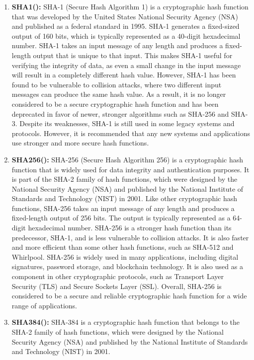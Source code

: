 \documentclass{article}
\begin{document}
\begin{enumerate}
    \item \textbf{SHA1():}
    SHA-1 (Secure Hash Algorithm 1) is a cryptographic hash function that was developed by the United States National Security Agency (NSA) and published as a federal standard in 1995. SHA-1 generates a fixed-sized output of 160 bits, which is typically represented as a 40-digit hexadecimal number.
SHA-1 takes an input message of any length and produces a fixed-length output that is unique to that input. This makes SHA-1 useful for verifying the integrity of data, as even a small change in the input message will result in a completely different hash value.
However, SHA-1 has been found to be vulnerable to collision attacks, where two different input messages can produce the same hash value. As a result, it is no longer considered to be a secure cryptographic hash function and has been deprecated in favor of newer, stronger algorithms such as SHA-256 and SHA-3.
Despite its weaknesses, SHA-1 is still used in some legacy systems and protocols. However, it is recommended that any new systems and applications use stronger and more secure hash functions.
    \item \textbf{SHA256():}
    SHA-256 (Secure Hash Algorithm 256) is a cryptographic hash function that is widely used for data integrity and authentication purposes. It is part of the SHA-2 family of hash functions, which were designed by the National Security Agency (NSA) and published by the National Institute of Standards and Technology (NIST) in 2001.
Like other cryptographic hash functions, SHA-256 takes an input message of any length and produces a fixed-length output of 256 bits. The output is typically represented as a 64-digit hexadecimal number.
SHA-256 is a stronger hash function than its predecessor, SHA-1, and is less vulnerable to collision attacks.
It is also faster and more efficient than some other hash functions, such as SHA-512 and Whirlpool.
SHA-256 is widely used in many applications, including digital signatures, password storage, and blockchain technology.
It is also used as a component in other cryptographic protocols, such as Transport Layer Security (TLS) and Secure Sockets Layer (SSL).
Overall, SHA-256 is considered to be a secure and reliable cryptographic hash function for a wide range of applications.
    \item \textbf{SHA384():}
    SHA-384 is a cryptographic hash function that belongs to the SHA-2 family of hash functions, which were designed by the National Security Agency (NSA) and published by the National Institute of Standards and Technology (NIST) in 2001.

\end{enumerate}
\end{document}
